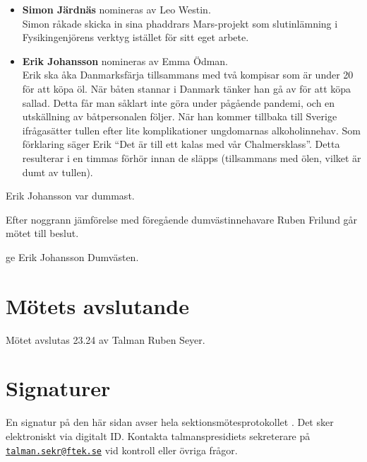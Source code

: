\documentclass[hidelinks]{sektionsmote}
\begin{document}
\begin{itemize}
  \item \textbf{Simon Järdnäs} nomineras av Leo Westin.\\
  Simon råkade skicka in sina phaddrars Mars-projekt som slutinlämning i Fysikingenjörens verktyg istället för sitt eget arbete. 

  \item \textbf{Erik Johansson} nomineras av Emma Ödman.\\
  Erik ska åka Danmarksfärja tillsammans med två kompisar som är under 20 för att köpa öl.
  När båten stannar i Danmark tänker han gå av för att köpa sallad.
  Detta får man såklart inte göra under pågående pandemi, och en utskällning av båtpersonalen följer.
  När han kommer tillbaka till Sverige ifrågasätter tullen efter lite komplikationer ungdomarnas alkoholinnehav.
  Som förklaring säger Erik \enquote{Det är till ett kalas med vår Chalmersklass}.
  Detta resulterar i en timmas förhör innan de släpps (tillsammans med ölen, vilket är dumt av tullen).

\end{itemize}

\begin{beslut}
  \item Erik Johansson var dummast.
\end{beslut}
Efter noggrann jämförelse med föregående dumvästinnehavare Ruben Frilund går mötet till beslut.
\begin{beslut}
  \item ge Erik Johansson Dumvästen.
\end{beslut}

\section{Mötets avslutande}
Mötet avslutas 23.24 av Talman Ruben Seyer.

\clearpage
\section*{Signaturer}
\label{sec:sig}
En signatur på den här sidan avser hela sektionsmötesprotokollet \themote. Det sker elektroniskt via digitalt ID. Kontakta talmanspresidiets sekreterare på \href{mailto:talman.sekr@ftek.se}{\texttt{talman.sekr@ftek.se}} vid kontroll eller övriga frågor. 

\vspace{4cm}
\begin{center}
\end{center}
\end{document}
